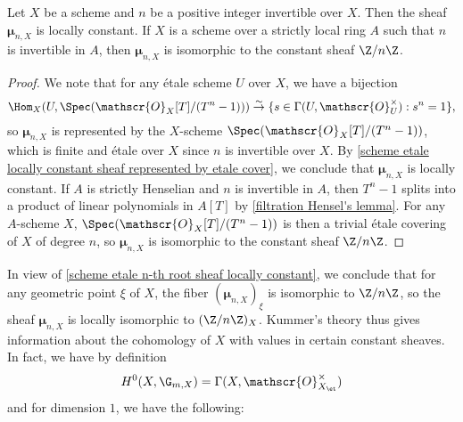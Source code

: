 \begin{proposition}\label{scheme etale n-th root sheaf locally constant}
Let $X$ be a scheme and $n$ be a positive integer invertible over $X$. Then the sheaf $\bm{\mu}_{n,X}$ is locally constant. If $X$ is a scheme over a strictly local ring $A$ such that $n$ is invertible in $A$, then $\bm{\mu}_{n,X}$ is isomorphic to the constant sheaf $\Z/n\Z$.
\end{proposition}
\begin{proof}
We note that for any \'etale scheme $U$ over $X$, we have a bijection
\[\Hom_X(U,\Spec(\mathscr{O}_X[T]/(T^n-1))) \stackrel{\sim}{\to} \{s\in\Gamma(U,\mathscr{O}_U^\times):s^n=1\},\]
so $\bm{\mu}_{n,X}$ is represented by the $X$-scheme $\Spec(\mathscr{O}_X[T]/(T^n-1))$, which is finite and \'etale over $X$ since $n$ is invertible over $X$. By \cref{scheme etale locally constant sheaf represented by etale cover}, we conclude that $\bm{\mu}_{n,X}$ is locally constant. If $A$ is strictly Henselian and $n$ is invertible in $A$, then $T^n-1$ splits into a product of linear polynomials in $A[T]$ by \cref{filtration Hensel's lemma}. For any $A$-scheme $X$, $\Spec(\mathscr{O}_X[T]/(T^n-1))$ is then a trivial \'etale covering of $X$ of degree $n$, so $\bm{\mu}_{n,X}$ is isomorphic to the constant sheaf $\Z/n\Z$.
\end{proof}

In view of \cref{scheme etale n-th root sheaf locally constant}, we conclude that for any geometric point $\xi$ of $X$, the fiber $(\bm{\mu}_{n,X})_\xi$ is isomorphic to $\Z/n\Z$, so the sheaf $\bm{\mu}_{n,X}$ is locally isomorphic to $(\Z/n\Z)_X$. Kummer's theory thus gives information about the cohomology of $X$ with values in certain constant sheaves. In fact, we have by definition
\[H^0(X,\G_{m,X})=\Gamma(X,\mathscr{O}_{X_\et}^\times)\]
and for dimension $1$, we have the following:


